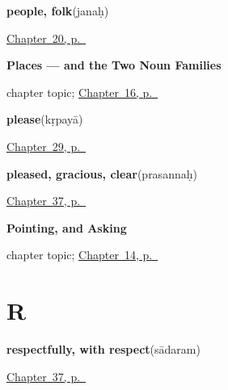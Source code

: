 \noindent\begin{minipage}[t]{\linewidth}
\raggedright
\textbf{people, folk}\enspace\emph{}\enspace(janaḥ)\par
\footnotesize \hyperref[ch:sa-people]{Chapter~20, p.~\pageref*{ch:sa-people}}
\end{minipage}\par\smallskip

\noindent\begin{minipage}[t]{\linewidth}
\raggedright
\textbf{Places --- and the Two Noun Families}\par
\footnotesize chapter topic; \hyperref[ch:sa-places]{Chapter~16, p.~\pageref*{ch:sa-places}}
\end{minipage}\par\smallskip

\noindent\begin{minipage}[t]{\linewidth}
\raggedright
\textbf{please}\enspace\emph{}\enspace(kṛpayā)\par
\footnotesize \hyperref[ch:sa-courtesy]{Chapter~29, p.~\pageref*{ch:sa-courtesy}}
\end{minipage}\par\smallskip

\noindent\begin{minipage}[t]{\linewidth}
\raggedright
\textbf{pleased, gracious, clear}\enspace\emph{}\enspace(prasannaḥ)\par
\footnotesize \hyperref[ch:sa-courtesy-more]{Chapter~37, p.~\pageref*{ch:sa-courtesy-more}}
\end{minipage}\par\smallskip

\noindent\begin{minipage}[t]{\linewidth}
\raggedright
\textbf{Pointing, and Asking}\par
\footnotesize chapter topic; \hyperref[ch:sa-pointing-and-asking]{Chapter~14, p.~\pageref*{ch:sa-pointing-and-asking}}
\end{minipage}\par\smallskip

\section*{R}

\noindent\begin{minipage}[t]{\linewidth}
\raggedright
\textbf{respectfully, with respect}\enspace\emph{}\enspace(sādaram)\par
\footnotesize \hyperref[ch:sa-courtesy-more]{Chapter~37, p.~\pageref*{ch:sa-courtesy-more}}
\end{minipage}\par\smallskip

